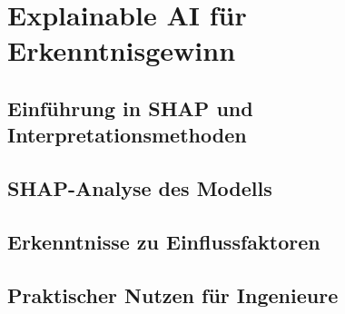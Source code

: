 \chapter{Explainable AI für Erkenntnisgewinn}
\section{Einführung in SHAP und Interpretationsmethoden}
\section{SHAP-Analyse des Modells}
\section{Erkenntnisse zu Einflussfaktoren}
\section{Praktischer Nutzen für Ingenieure}